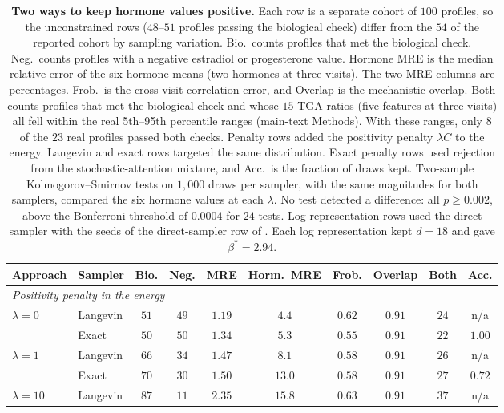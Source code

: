 \begin{table}[ht]
\centering
\caption{\textbf{Two ways to keep hormone values positive.} Each row is a
separate cohort of $100$ profiles, so the unconstrained rows ($48$--$51$ profiles passing the
biological check) differ from the $54$ of the reported cohort by sampling variation. Bio.\
counts profiles that met the biological check. Neg.\ counts profiles with a negative estradiol
or progesterone value. Hormone MRE is the median relative error of the six hormone means (two
hormones at three visits). The two MRE columns are percentages. Frob.\ is the cross-visit
correlation error, and Overlap is the mechanistic overlap. Both counts profiles that met the
biological check and whose $15$ TGA ratios (five features at three visits) all fell within the
real 5th--95th percentile ranges (main-text Methods). With these ranges, only $8$ of the $23$
real profiles passed both checks. Penalty rows added the
positivity penalty $\lambda C$ to the energy. Langevin and exact rows targeted the same distribution.
Exact penalty rows used rejection from the stochastic-attention mixture, and Acc.\ is
the fraction of draws kept. Two-sample
Kolmogorov--Smirnov tests on $1{,}000$ draws per sampler, with the same magnitudes for both
samplers, compared the six hormone values at each $\lambda$. No test detected a difference:
all $p\ge0.002$, above the Bonferroni threshold of $0.0004$ for $24$ tests.
Log-representation rows used the direct sampler with the seeds of the direct-sampler row of
\supptable{stab:sampling-ladder}. Each log representation kept $d{=}18$ and gave
$\beta^*=2.94$.}
\label{stab:positivity}
{\small
\setlength{\tabcolsep}{3.5pt}
\begin{tabular}{llcccccccc}
\toprule
Approach & Sampler & Bio. & Neg. & MRE & Horm.\ MRE & Frob. & Overlap & Both & Acc. \\
\midrule
\multicolumn{10}{l}{\emph{Positivity penalty in the energy}} \\
$\lambda=0$     & Langevin & $51$  & $49$ & $1.19$ & $4.4$  & $0.62$ & $0.91$ & $24$ & n/a \\
                & Exact    & $50$  & $50$ & $1.34$ & $5.3$  & $0.55$ & $0.91$ & $22$ & $1.00$ \\
$\lambda=1$     & Langevin & $66$  & $34$ & $1.47$ & $8.1$  & $0.58$ & $0.91$ & $26$ & n/a \\
                & Exact    & $70$  & $30$ & $1.50$ & $13.0$ & $0.58$ & $0.91$ & $27$ & $0.72$ \\
$\lambda=10$    & Langevin & $87$  & $11$ & $2.35$ & $15.8$ & $0.63$ & $0.91$ & $37$ & n/a \\

\end{tabular}}
\end{table}
